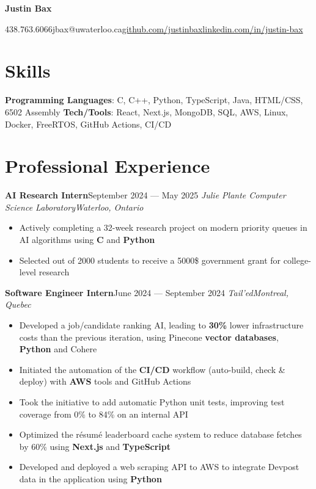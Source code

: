 \documentclass{article}
\newcommand{\cdelim}{\;\textbar\;}
\newcommand{\newrole}[4]{
    {\normalfont\textbf{#1}\hfill#3}
    \newline
    \textit{#2}\hfill\textit{#4}
}
\newenvironment{bulletpoints}{\begin{itemize}\setlength\itemsep{-0.2em}}{\end{itemize}}
\begin{document}
\begin{center}
    {\Huge\bfseries Justin Bax}\\\vspace*{2pt}

    438.763.6066\cdelim jbax@uwaterloo.ca\cdelim\href{https://github.com/justinbax}{github.com/justinbax}\cdelim\href{https://linkedin.com/in/justin-bax}{linkedin.com/in/justin-bax}\\
\end{center}

\section*{Skills}

{\bfseries Programming Languages}: C, C++, Python, TypeScript, Java, HTML/CSS, 6502 Assembly
\newline
{\bfseries Tech/Tools}: React, Next.js, MongoDB, SQL, AWS, Linux, Docker, FreeRTOS, GitHub Actions, CI/CD


\section*{Professional Experience}

\newrole{AI Research Intern}{Julie Plante Computer Science Laboratory}{September 2024 --- May 2025}{Waterloo, Ontario}
\begin{bulletpoints}
    \item Actively completing a 32-week research project on modern priority queues in AI algorithms using \textbf{C} and \textbf{Python}
    \item Selected out of 2000 students to receive a 5000\$ government grant for college-level research
\end{bulletpoints}

\newrole{Software Engineer Intern}{Tail'ed}{June 2024 --- September 2024}{Montreal, Quebec}
\begin{bulletpoints}
    \item Developed a job/candidate ranking AI, leading to \textbf{30\%} lower infrastructure costs than the previous iteration, using Pinecone \textbf{vector databases}, \textbf{Python} and Cohere
    \item Initiated the automation of the \textbf{CI/CD} workflow (auto-build, check \& deploy) with \textbf{AWS} tools and GitHub Actions
    \item Took the initiative to add automatic Python unit tests, improving test coverage from 0\% to 84\% on an internal API
    \item Optimized the résumé leaderboard cache system to reduce database fetches by 60\% using \textbf{Next.js} and \textbf{TypeScript}
    \item Developed and deployed a web scraping API to AWS to integrate Devpost data in the application using \textbf{Python}
\end{bulletpoints}
\end{document}
